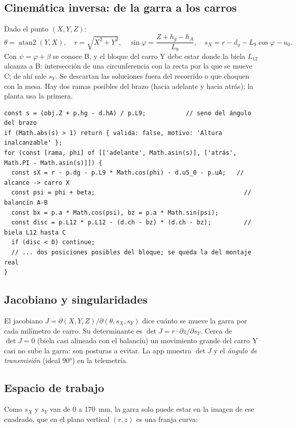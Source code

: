 \documentclass[a4paper,11pt]{article}
\begin{document}
\subsection{Cinemática inversa: de la garra a los carros}
Dado el punto $(X, Y, Z)$:
\[
\theta = \operatorname{atan2}(Y, X), \quad r = \sqrt{X^2+Y^2}, \quad \sin\varphi = \frac{Z + h_g - h_A}{L_9}, \quad s_X = r - d_g - L_9\cos\varphi - u_0 .
\]
Con $\psi = \varphi + \beta$ se conoce B, y el bloque del carro Y debe estar donde la biela $L_{12}$ alcanza a B: intersección de una circunferencia con la recta por la que se mueve C; de ahí sale $s_Y$. Se descartan las soluciones fuera del recorrido o que choquen con la mesa. Hay dos ramas posibles del brazo (hacia adelante y hacia atrás); la planta usa la primera.

\begin{lstlisting}[style=js, caption={Fragmento de la cinemática inversa (\texttt{web/js/cinematica.js}).}]
const s = (obj.Z + p.hg - d.hA) / p.L9;           // seno del ángulo del brazo
if (Math.abs(s) > 1) return { valida: false, motivo: 'Altura inalcanzable' };
for (const [rama, phi] of [['adelante', Math.asin(s)], ['atrás', Math.PI - Math.asin(s)]]) {
  const sX = r - p.dg - p.L9 * Math.cos(phi) - d.u5_0 - p.uA;   // alcance -> carro X
  const psi = phi + beta;                                         // balancín A-B
  const bx = p.a * Math.cos(psi), bz = p.a * Math.sin(psi);
  const disc = p.L12 * p.L12 - (d.ch - bz) * (d.ch - bz);         // biela L12 hasta C
  if (disc < 0) continue;
  // ... dos posiciones posibles del bloque; se queda la del montaje real
}
\end{lstlisting}

\subsection{Jacobiano y singularidades}
El jacobiano $J = \partial(X,Y,Z)/\partial(\theta, s_X, s_Y)$ dice cuánto se mueve la garra por cada milímetro de carro. Su determinante es $\det J = r \cdot \partial z/\partial s_Y$. Cerca de $\det J = 0$ (biela casi alineada con el balancín) un movimiento grande del carro Y casi no sube la garra: son posturas a evitar. La app muestra $\det J$ y el \emph{ángulo de transmisión} (ideal 90°) en la telemetría.

\subsection{Espacio de trabajo}
Como $s_X$ y $s_Y$ van de 0 a 170~mm, la garra solo puede estar en la imagen de ese cuadrado, que en el plano vertical $(r, z)$ es una franja curva:
\end{document}
